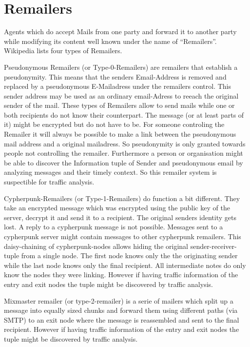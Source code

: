 \section{Remailers}
Agents which do accept Mails from one party and forward it to another party while modifying its content well known under the name of ``Remailers''. Wi\-ki\-pe\-dia \cite{wiki:remailer} lists four types of Remailers.\par

Pseudonymous Remailers (or Type-0-Remailers) are remailers that establish a pseu\-do\-ny\-mi\-ty. This means that the senders Email-Address is removed and replaced by a pseudonymous E-Mailadress under the remailers control. This sender address may be used as an ordinary email-Adress to reeach the original sender of the mail. These types of Remailers allow to send mails while one or both recipients do not know their counterpart. The message (or at least parts of it) might be encrypted but do not have to be. For someone controling the Remailer it will always be possible to make a link between the pseudonymous mail address and a original mailadress. So pseudonymity is only granted towards people not controlling the remailer. Furthermore a person or organisation might be able to discover the Information tuple of Sender and pseudonymous email by analyzing messages and their timely context. So this remailer system is suspectible for traffic analysis.\par

Cypherpunk-Remailers (or Type-1-Remailers) do function a bit different. They take an encrypted message which was encrypted using the public key of the server, decrypt it and send it to a recipient. The original senders identity gets lost. A reply to a cypherpunk message is not possible. Messages sent to a cypherpunk server might contain messages to other cypherpunk remailers. This daisy-chaining of cypherpunk-nodes allows hiding the original sender-receiver-tuple from a single node. The first node knows only the the originating sender while the last node knows only the final recipient. All intermediate notes do only know the nodes they were linking. However if having traffic information of the entry and exit nodes the tuple might be discovered by traffic analysis.\par

Mixmaster remailer (or type-2-remailer) is a serie of mailers which split up a message into equally sized chunks and forward them using different paths (via SMTP) to an exit node where the message is reassembled and sent to the final recipient. However if having traffic information of the entry and exit nodes the tuple might be discovered by traffic analysis.\par

